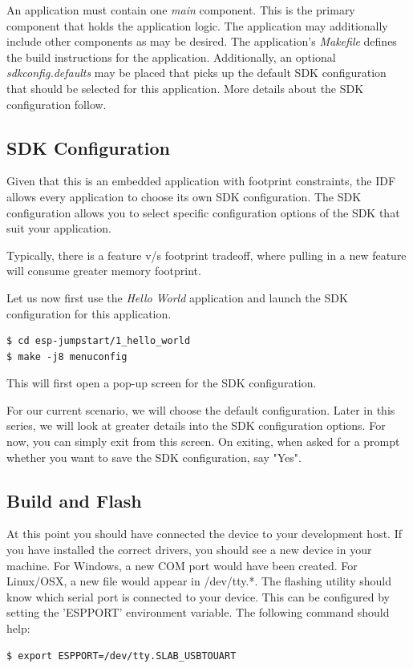 \documentclass[main.tex]{subfiles}
\begin{document}
An application must contain one \textit{main} component. This is the primary component that holds the application logic. The application may additionally include other components as may be desired.
The application's \textit{Makefile} defines the build instructions for the application. 
Additionally, an optional \textit{sdkconfig.defaults} may be placed that picks up the default SDK configuration that should be selected for this application. More details about the SDK configuration follow.

\subsection{SDK Configuration}

Given that this is an embedded application with footprint constraints, the IDF allows every application to choose its own SDK configuration. The SDK configuration allows you to select specific configuration options of the SDK that suit your application.

Typically, there is a feature v/s footprint tradeoff, where pulling in a new feature will consume greater memory footprint.

Let us now first use the \textit{Hello World} application and launch the SDK configuration for this application.

\begin{verbatim}
$ cd esp-jumpstart/1_hello_world
$ make -j8 menuconfig
\end{verbatim}

This will first open a pop-up screen for the SDK configuration.

For our current scenario, we will choose the default configuration. Later in this series, we will look at greater details into the SDK configuration options. For now, you can simply exit from this screen. On exiting, when asked for a prompt whether you want to save the SDK configuration, say "Yes".


\subsection{Build and Flash}
At this point you should have connected the device to your development host. If you have installed the correct drivers, you should see a new device in your machine. For Windows, a new COM port would have been created. For Linux/OSX, a new file would appear in /dev/tty.*. The flashing utility should know which serial port is connected to your device. This can be configured by setting the 'ESPPORT' environment variable. The following command should help:
\begin{verbatim}
$ export ESPPORT=/dev/tty.SLAB_USBTOUART
\end{verbatim}
\end{document}
